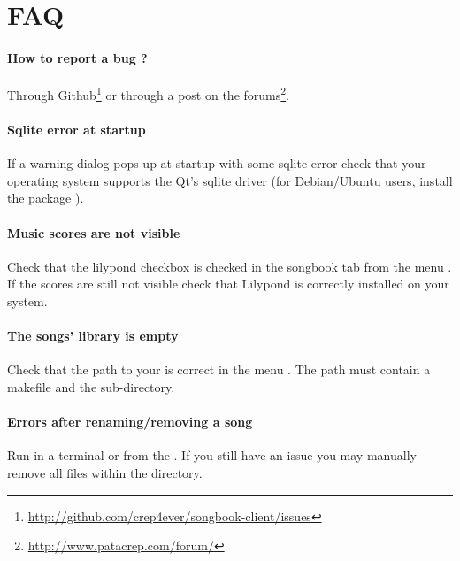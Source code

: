 \section{FAQ}

\paragraph{How to report a bug ?}
Through
Github\footnote{\url{http://github.com/crep4ever/songbook-client/issues}}
or through a post on the
forums\footnote{\url{http://www.patacrep.com/forum/}}.

\paragraph{Sqlite error at startup} 
If a warning dialog pops up at startup with some sqlite error
check that your operating system supports the Qt's sqlite driver (for
Debian/Ubuntu users, install the package ).

\paragraph{Music scores are not visible}
Check that the lilypond checkbox is checked in the songbook tab from
the menu . If the scores are still not visible
check that Lilypond is correctly installed on your system.

\paragraph{The songs' library is empty} 
Check that the path to your \recueil{} is correct in the menu
. The path must contain a makefile and the
 sub-directory.

\paragraph{Errors after renaming/removing a song} 
Run  in a terminal or  from
the \client{}. If you still have an issue you may manually remove all
 files within the  directory.
